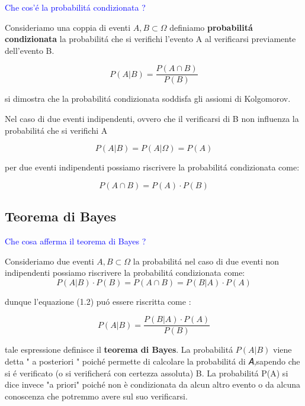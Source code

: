 \documentclass[11pt,a4paper]{book}
\begin{document}
\textcolor{blue}{Che cos'\'{e} la probabilit\'{a} condizionata ?} \newline

Consideriamo una coppia di eventi $A,B \subset \Omega$ definiamo \textbf{probabilit\'{a} condizionata} la probabilit\'{a} che si verifichi l'evento A al verificarsi previamente dell'evento B. 

\begin{equation}
	P(A \vert B) = \dfrac{P(A\cap B)}{P(B)}
\end{equation}

\noindent si dimostra che la probabilit\'{a} condizionata soddisfa gli assiomi di Kolgomorov.

\noindent Nel caso di due eventi indipendenti, ovvero che il verificarsi di B non influenza la probabilit\'{a} che si verifichi A

\begin{equation*}
	P(A \vert B) = P(A \vert \Omega) = P(A)
\end{equation*}

\noindent per due eventi indipendenti possiamo riscrivere la probabilit\'{a} condizionata come:

\begin{equation}
	P(A \cap B) = P(A) \cdot P(B)
\end{equation}

\subsection{Teorema di Bayes}

\textcolor{blue}{Che cosa afferma il teorema di Bayes ?} \newline

Consideriamo due eventi $A,B \subset \Omega$ la probabilit\'{a} nel caso di due eventi non indipendenti possiamo riscrivere la probabilit\'{a} condizionata come:
\begin{equation*}
	P(A \vert B) \cdot P(B) = P(A\cap B) = P(B\vert A) \cdot P(A)
\end{equation*}

dunque l'equazione (1.2) pu\'{o} essere riscritta come : 

\begin{equation}
	P(A \vert B) = \dfrac{P(B \vert A) \cdot P(A)}{P(B)}
\end{equation}

tale espressione definisce il \textbf{teorema di Bayes}. La probabilit\'{a} 
$P(A \vert B)$ viene detta " a posteriori " poich\'{e} permette di calcolare la probabilit\'{a} di 𝐴,sapendo che si \'{e} verificato (o si verificher\'{a} con certezza assoluta) B. \newline
La probabilit\'{a} P(A) si dice invece "a priori" poich\'{e} non è condizionata da alcun altro evento o da alcuna conoscenza che potremmo avere sul suo verificarsi. 
\end{document}
